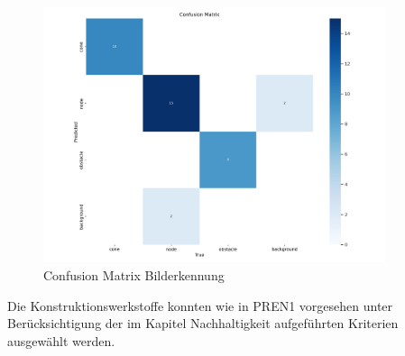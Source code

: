 \begin{figure}[H]
\centering
\includegraphics[width=10cm]{assets/IT/yolo/confusion_matrix.png}
\caption{Confusion Matrix Bilderkennung}
\label{fig:conf-matrix-model}
\end{figure}


Die Konstruktionswerkstoffe konnten wie in PREN1 vorgesehen unter Berücksichtigung der im Kapitel Nachhaltigkeit aufgeführten Kriterien ausgewählt werden.
